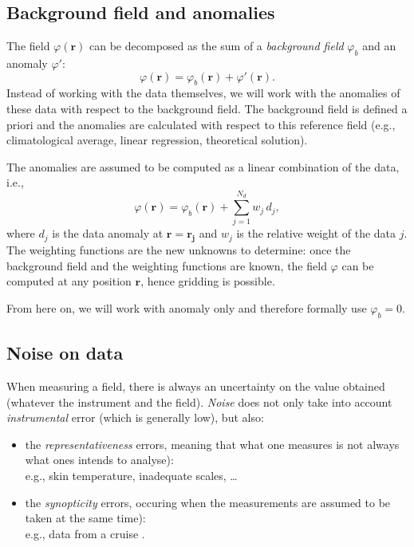 \subsection{Background field and anomalies}

The field $\varphi(\mathbf{r})$ can be decomposed as the sum of a \textit{background field}  $\varphi_b$ and an anomaly $\varphi'$: 
\begin{equation}
 \varphi(\mathbf{r}) = \varphi_b(\mathbf{r}) + \varphi'(\mathbf{r}).
 \label{background}
\end{equation}
Instead of working with the data themselves, we will work with the anomalies of these data with respect to the background field. The background field is defined a priori and the anomalies are calculated with respect to this reference field (e.g., climatological average, linear regression, theoretical solution). 

The anomalies are assumed to be computed as a linear combination of the data, i.e., 
\begin{equation}
\varphi(\mathbf{r}) = \varphi_b(\mathbf{r}) + \sum_{j=1}^{N_d} w_j\, d_j,
\label{objectiveanal}
\end{equation}
where $d_{j}$ is the data anomaly at $\mathbf{r}= \mathbf{r_{j}}$ and $w_j$ is the relative weight of the data $j$. The weighting functions are the new unknowns to determine: once the background field and the weighting functions are known, the field $\varphi$ can be computed at any position $\mathbf{r}$, hence gridding is possible.

From here on, we will work with anomaly only and therefore formally use $\varphi_{b}=0$.

\subsection{Noise on data}

When measuring a field, there is always an uncertainty on the value obtained (whatever the instrument and the field). \textit{Noise}  does not only take into account \textit{instrumental} error (which is generally low), but also:
\begin{itemize}
\item the \textit{representativeness} errors, meaning that what one measures is not always what ones intends to analyse):\\
e.g., skin temperature, inadequate scales, \ldots
\item the \textit{synopticity} errors, occuring when the measurements are assumed to be taken at the same time):\\
e.g., data from a cruise \citep{RIXEN01}.
\end{itemize}

